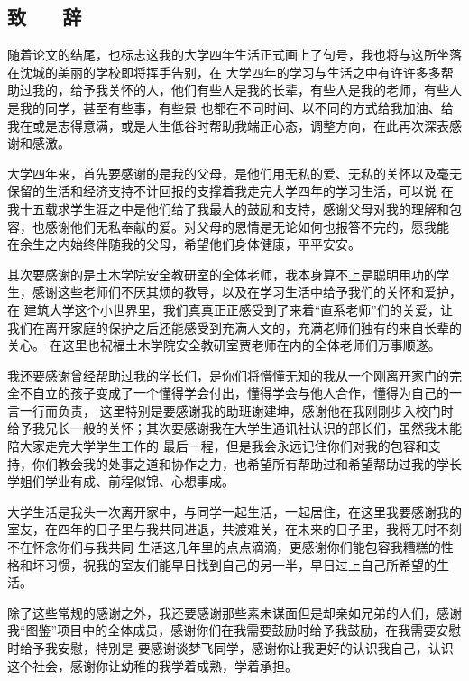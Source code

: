 \begin{center}
    \section*{  \textbf{致 ~~ 辞}}
    \end{center}

随着论文的结尾，也标志这我的大学四年生活正式画上了句号，我也将与这所坐落在沈城的美丽的学校即将挥手告别，在
大学四年的学习与生活之中有许许多多帮助过我的，给予我关怀的人，他们有些人是我的长辈，有些人是我的老师，有些人是我的同学，甚至有些事，有些景
也都在不同时间、以不同的方式给我加油、给我在或是志得意满，或是人生低谷时帮助我端正心态，调整方向，在此再次深表感谢和感激。

大学四年来，首先要感谢的是我的父母，是他们用无私的爱、无私的关怀以及毫无保留的生活和经济支持不计回报的支撑着我走完大学四年的学习生活，可以说
在我十五载求学生涯之中是他们给了我最大的鼓励和支持，感谢父母对我的理解和包容，也感谢他们无私奉献的爱。对父母的恩情是无论如何也报答不完的，愿我能
在余生之内始终伴随我的父母，希望他们身体健康，平平安安。

其次要感谢的是土木学院安全教研室的全体老师，我本身算不上是聪明用功的学生，感谢这些老师们不厌其烦的教导，以及在学习生活中给予我们的关怀和爱护，在
建筑大学这个小世界里，我们真真正正感受到了来着“直系老师”们的关爱，让我们在离开家庭的保护之后还能感受到充满人文的，充满老师们独有的来自长辈的关心。
在这里也祝福土木学院安全教研室贾老师在内的全体老师们万事顺遂。

我还要感谢曾经帮助过我的学长们，是你们将懵懂无知的我从一个刚离开家门的完全不自立的孩子变成了一个懂得学会付出，懂得学会与他人合作，懂得为自己的一言一行而负责，
这里特别是要感谢我的助班谢建坤，感谢他在我刚刚步入校门时给予我兄长一般的关怀；其次要感谢我在大学生通讯社认识的部长们，虽然我未能陪大家走完大学学生工作的
最后一程，但是我会永远记住你们对我的包容和支持，你们教会我的处事之道和协作之力，也希望所有帮助过和希望帮助过我的学长学姐们学业有成、前程似锦、心想事成。

大学生活是我头一次离开家中，与同学一起生活，一起居住，在这里我要感谢我的室友，在四年的日子里与我共同进退，共渡难关，在未来的日子里，我将无时不刻不在怀念你们与我共同
生活这几年里的点点滴滴，更感谢你们能包容我糟糕的性格和坏习惯，祝我的室友们能早日找到自己的另一半，早日过上自己所希望的生活。

除了这些常规的感谢之外，我还要感谢那些素未谋面但是却亲如兄弟的人们，感谢我“图鉴”项目中的全体成员，感谢你们在我需要鼓励时给予我鼓励，在我需要安慰时给予我安慰，特别是
要感谢谈梦飞同学，感谢你让我更好的认识我自己，认识这个社会，感谢你让幼稚的我学着成熟，学着承担。

